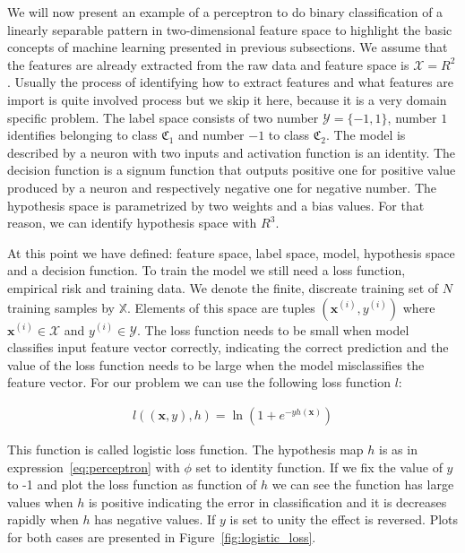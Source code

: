 \documentclass[english, 12pt, a4paper, elec, utf8, online]{aaltothesis}
\begin{document}
We will now present an example of a perceptron to do binary classification of a linearly separable pattern in two-dimensional feature space to highlight the basic concepts of machine learning presented in previous subsections. We assume that the features are already extracted from the raw data and feature space is $\mathcal{X} = R^2$. Usually the process of identifying how to extract features and what features are import is quite involved process but we skip it here, because it is a very domain specific problem. The label space consists of two number $\mathcal{Y} = \{-1, 1\}$, number $1$ identifies belonging to class $\mathfrak{C_{1}}$ and number $-1$ to class $\mathfrak{C_{2}}$. The model is described by a neuron with two inputs and activation function is an identity. The decision function is a signum function that outputs positive one for positive value produced by a neuron and respectively negative one for negative number. The hypothesis space is parametrized by two weights and a bias values. For that reason, we can identify hypothesis space with $R^3$.  

At this point we have defined: feature space, label space, model, hypothesis space and a decision function. To train the model we still need a loss function, empirical risk and training data. We denote the finite, discreate training set of $N$ training samples by $\mathbb{X}$. Elements of this space are tuples $(\mathbf{x}^{(i)}, y^{(i)})$ where $ \mathbf{x}^{(i)} \in \mathcal{X}$ and $ y^{(i)} \in \mathcal{Y}$. The loss function needs to be small when model classifies input feature vector correctly, indicating the correct prediction and the value of the loss function needs to be large when the model misclassifies the feature vector. For our problem we can use the following loss function $l$:

\begin{align}\label{eq:logistic_loss}
l((\mathbf{x},y),h) = \ln{(1+e^{-yh(\mathbf{x})})}
\end{align}

This function is called logistic loss function. The hypothesis map $h$ is as in expression~\ref{eq:perceptron} with $\phi$ set to identity function. If we fix the value of $y$ to -1 and plot the loss function as function of $h$ we can see the function has large values when $h$ is positive indicating the error in classification and it is decreases rapidly when $h$ has negative values. If $y$ is set to unity the effect is reversed. Plots for both cases are presented in Figure~\ref{fig:logistic_loss}.
 
\end{document}
